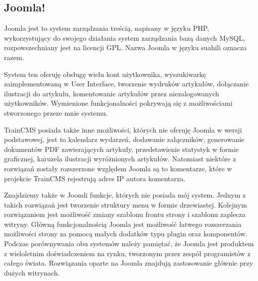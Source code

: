 \documentclass[openright]{xmgr}
\begin{document}
\subsection{Joomla!}

Joomla jest to system zarządzania treścią, napisany w języku PHP, wykorzystujący do swojego działania system zarządzania bazą danych MySQL, rozpowszechniany jest na licencji GPL. Nazwa Joomla w języku suahili oznacza razem.

System ten oferuję obsługę wielu kont użytkownika, wyszukiwarkę zaimplementowaną w User Interface, tworzenie wydruków artykułów, dołączanie ilustracji do artykułu, komentowanie artykułów przez niezalogowanych użytkowników. Wymienione funkcjonalności pokrywają się z możliwościami stworzonego przeze mnie systemu.

\newpage

TrainCMS posiada także inne możliwości, których nie oferuję Joomla w wersji podstawowej, jest to kalendarz wydarzeń, dodawanie załączników, generowanie dokumentów PDF zawierających artykuły, przedstawienie statystyk w formie graficznej, karuzela ilustracji wyróżnionych artykułów. Natomiast niektóre z rozwiązań zostały rozszerzone względem Joomla są to komentarze, które w projekcie TrainCMS rejestrują adres IP autora komentarza.

Znajdziemy także w Joomli funkcje, których nie posiada mój system. Jednym z takich rozwiązań jest tworzenie struktury menu w formie drzewiastej. Kolejnym rozwiązaniem jest możliwość zmiany szablonu frontu strony i szablonu zaplecza witryny. Główną funkcjonalnością Joomla jest możliwość łatwego rozszerzania możliwości strony za pomocą małych dodatków typu plugin oraz komponentów. Podczas porównywania obu systemów należy pamiętać, że Joomla jest produktem z wieloletnim doświadczeniem na rynku, tworzonym przez zespół programistów z całego świata. Rozwiązania oparte na Joomla znajdują zastosowanie głównie przy dużych witrynach.

\newpage
\end{document}
